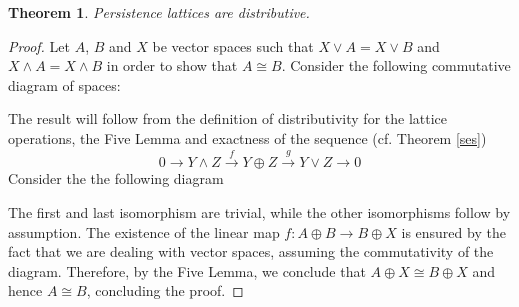 \documentclass[10pt]{amsart}
\newtheorem{theorem}{Theorem}[section]
\begin{document}

\begin{theorem}\label{distributive}
Persistence lattices are distributive.
\end{theorem}

\begin{proof}
Let $A$, $B$ and $X$ be vector spaces such that $X\vee A=X\vee B$ and $X\wedge A=X\wedge B$ in order to show that $A\cong B$. 
Consider the following commutative diagram of spaces:

\begin{center}
\end{center}

\noindent
The result will follow from the definition of distributivity for the lattice operations, the Five Lemma
and exactness of the sequence (cf. Theorem \ref{ses})
\begin{equation*}
0\rightarrow Y\wedge Z \xrightarrow{f} Y\oplus Z \xrightarrow{g} Y\vee Z \rightarrow 0 
\end{equation*}
Consider the the following diagram
\begin{center}
\end{center}
%
The first and last isomorphism are trivial, while the other isomorphisms follow by assumption. 
The existence of the linear map $f: A\oplus B \rightarrow B\oplus X$ is ensured by the fact that we are dealing with vector spaces, assuming the commutativity of the diagram. %
Therefore, by the Five Lemma, we conclude that $A\oplus X \cong B\oplus X$ and hence $A\cong B$, concluding the proof.

\end{proof}
\end{document}
